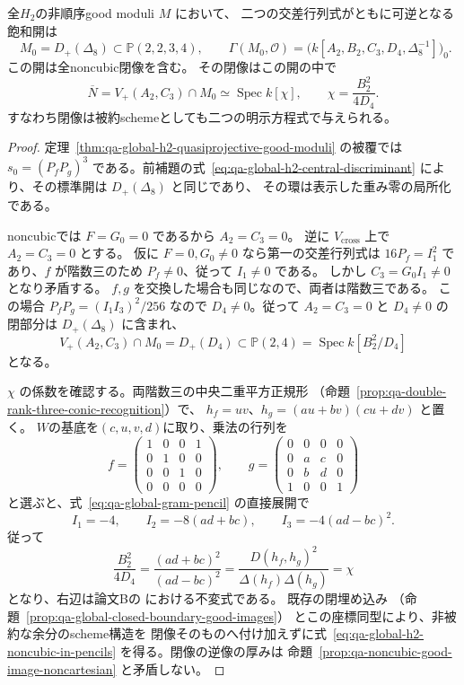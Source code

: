 \begin{proposition}
\label{prop:qa-global-h2-central-affine-ring}
全$H_2$の非順序good moduli $M$ において、
二つの交差行列式がともに可逆となる飽和開は
\[
 \boxed{\quad M_0=D_+(\Delta_8)\subset\mathbb P(2,2,3,4),\qquad
 \Gamma(M_0,\mathcal O)
 =\bigl(k[A_2,B_2,C_3,D_4,\Delta_8^{-1}]\bigr)_0.\quad}
 \tag{AFF}\label{eq:qa-global-h2-central-affine-ring}
\]
この開は全noncubic閉像を含む。
その閉像はこの開の中で
\[
 \boxed{\quad \overline N=V_+(A_2,C_3)\cap M_0
  \simeq\operatorname{Spec}k[\chi],
  \qquad\chi=\frac{B_2^2}{4D_4}.\quad}
 \tag{NC}\label{eq:qa-global-h2-noncubic-in-pencils}
\]
すなわち閉像は被約schemeとしても二つの明示方程式で与えられる。
\end{proposition}
\begin{proof}
定理~\ref{thm:qa-global-h2-quasiprojective-good-moduli} の被覆では
$s_0=(P_fP_g)^3$ である。前補題の式~\eqref{eq:qa-global-h2-central-discriminant}
により、その標準開は $D_+(\Delta_8)$ と同じであり、
その環は表示した重み零の局所化である。

noncubicでは $F=G_0=0$ であるから $A_2=C_3=0$。
逆に $V_{\mathrm{cross}}$ 上で $A_2=C_3=0$ とする。
仮に $F=0,G_0\ne0$ なら第一の交差行列式は
$16P_f=I_1^2$ であり、$f$ が階数三のため
$P_f\ne0$、従って $I_1\ne0$ である。
しかし $C_3=G_0I_1\ne0$ となり矛盾する。
$f,g$ を交換した場合も同じなので、両者は階数三である。
この場合 $P_fP_g=(I_1I_3)^2/256$ なので
$D_4\ne0$。従って $A_2=C_3=0$ と
$D_4\ne0$ の閉部分は $D_+(\Delta_8)$ に含まれ、
\[
  V_+(A_2,C_3)\cap M_0=D_+(D_4)\subset\mathbb P(2,4)
    =\operatorname{Spec}k[B_2^2/D_4]
\]
となる。

$\chi$ の係数を確認する。両階数三の中央二重平方正規形
（命題~\ref{prop:qa-double-rank-three-conic-recognition}）で、
$h_f=uv$、$h_g=(au+bv)(cu+dv)$ と置く。
$W$の基底を$(c,u,v,d)$に取り、乗法の行列を
\[
 f=\begin{pmatrix}
 1&0&0&1\\0&1&0&0\\0&0&1&0\\0&0&0&0
 \end{pmatrix},\qquad
 g=\begin{pmatrix}
 0&0&0&0\\0&a&c&0\\0&b&d&0\\1&0&0&1
 \end{pmatrix}
\]
と選ぶと、式~\eqref{eq:qa-global-gram-pencil} の直接展開で
\[
 I_1=-4,\qquad I_2=-8(ad+bc),\qquad
 I_3=-4(ad-bc)^2.
\]
従って
\[
 \frac{B_2^2}{4D_4}
   =\frac{(ad+bc)^2}{(ad-bc)^2}
   =\frac{D(h_f,h_g)^2}{\Delta(h_f)\Delta(h_g)}
   =\chi
\]
となり、右辺は論文Bの
\cite[\texttt{prop:moduli-noncubic-good-moduli}]{QuadricModuli2026}
における不変式である。
既存の閉埋め込み
（命題~\ref{prop:qa-global-closed-boundary-good-images}）
とこの座標同型により、非被約な余分のscheme構造を
閉像そのものへ付け加えずに式~\eqref{eq:qa-global-h2-noncubic-in-pencils}
を得る。閉像の逆像の厚みは
命題~\ref{prop:qa-noncubic-good-image-noncartesian} と矛盾しない。
\end{proof}

